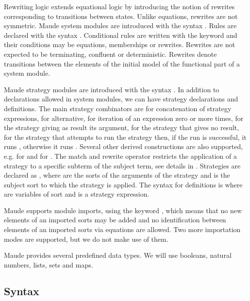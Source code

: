 Rewriting logic extends equational logic by introducing the notion of rewrites corresponding to transitions between states.
Unlike equations, rewrites are not symmetric. Maude system modules
are introduced with the syntax . Rules
are declared with the syntax 
. 
Conditional rules are written with the keyword
and their conditions
 may be equations, memberships or rewrites. 
Rewrites are not expected to be terminating, confluent or deterministic.
Rewrites denote transitions between the elements of the initial model
of the functional part of a system module.

Maude strategy modules are introduced with the syntax
. In addition to declarations allowed in
system modules, we can have strategy declarations and definitions.
The main strategy combinators are \code{;} for concatenation of strategy 
expressions, \code{|} for alternative, \code{*} for iteration of an
expression zero or more times,  for the strategy giving as result its argument,  for the strategy that gives no result,
 for the strategy that attempts to run the
strategy  then, if the run is successful, it runs ,
otherwise it runs .
Several other derived constructions are also
supported, e.g.  for  and  for . The match and rewrite operator 
 restricts the application of a strategy to a specific
subterm of the subject term, see details in \cite{DBLP:conf/maude/2007}.
Strategies are declared as ,
where  are the sorts of the arguments of the strategy
and  is the subject sort to which the strategy is applied.
The syntax for definitions is  where
 are variables of sort  and  is a strategy expression.


Maude supports module imports, using the keyword ,
which means that no new elements of an imported sorts may be 
added and 
no identification between elements of an imported sorts via
equations are allowed. 
Two more importation modes are supported, but we do not make use 
of them.

Maude provides several predefined data types. We will use booleans, natural
numbers, lists, sets and maps.
  
\subsection{Syntax}

